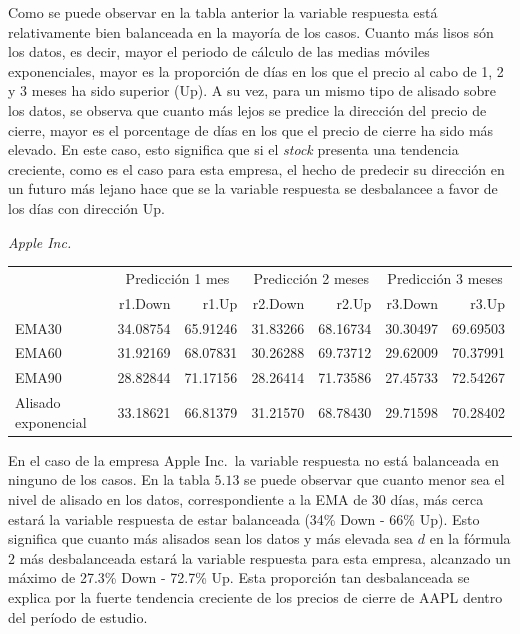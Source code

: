 \documentclass[]{DissertateUSU}
\begin{document}
\setlength\parskip{7ex}

\noindent Como se puede observar en la tabla anterior la variable
respuesta está relativamente bien balanceada en la mayoría de los casos.
Cuanto más lisos són los datos, es decir, mayor el periodo de cálculo de
las medias móviles exponenciales, mayor es la proporción de días en los
que el precio al cabo de 1, 2 y 3 meses ha sido superior (Up). A su vez,
para un mismo tipo de alisado sobre los datos, se observa que cuanto más
lejos se predice la dirección del precio de cierre, mayor es el
porcentage de días en los que el precio de cierre ha sido más elevado.
En este caso, esto significa que si el \emph{stock} presenta una
tendencia creciente, como es el caso para esta empresa, el hecho de
predecir su dirección en un futuro más lejano hace que se la variable
respuesta se desbalancee a favor de los días con dirección Up.

\setlength\parskip{5ex}

\emph{Apple Inc.} \setlength\parskip{5ex}

\begin{table}[H]
\centering\begingroup\fontsize{10}{12}\selectfont

\begin{tabular}{l|r|r|r|r|r|r}
\hline
\multicolumn{1}{c|}{ } & \multicolumn{2}{c|}{Predicción 1 mes} & \multicolumn{2}{c|}{Predicción 2 meses} & \multicolumn{2}{c}{Predicción 3 meses} \\
\cline{2-3} \cline{4-5} \cline{6-7}
  & r1.Down & r1.Up & r2.Down & r2.Up & r3.Down & r3.Up\\
\hline
EMA30 & 34.08754 & 65.91246 & 31.83266 & 68.16734 & 30.30497 & 69.69503\\
\hline
EMA60 & 31.92169 & 68.07831 & 30.26288 & 69.73712 & 29.62009 & 70.37991\\
\hline
EMA90 & 28.82844 & 71.17156 & 28.26414 & 71.73586 & 27.45733 & 72.54267\\
\hline
Alisado exponencial & 33.18621 & 66.81379 & 31.21570 & 68.78430 & 29.71598 & 70.28402\\
\hline
\end{tabular}
\endgroup{}
\end{table}

\setlength\parskip{7ex}

\noindent En el caso de la empresa Apple Inc.~la variable respuesta no
está balanceada en ninguno de los casos. En la tabla \(5.13\) se puede
observar que cuanto menor sea el nivel de alisado en los datos,
correspondiente a la EMA de 30 días, más cerca estará la variable
respuesta de estar balanceada (34\% Down - 66\% Up). Esto significa que
cuanto más alisados sean los datos y más elevada sea \(d\) en la fórmula
\(2\) más desbalanceada estará la variable respuesta para esta empresa,
alcanzado un máximo de 27.3\% Down - 72.7\% Up. Esta proporción tan
desbalanceada se explica por la fuerte tendencia creciente de los
precios de cierre de AAPL dentro del período de estudio.
\end{document}
